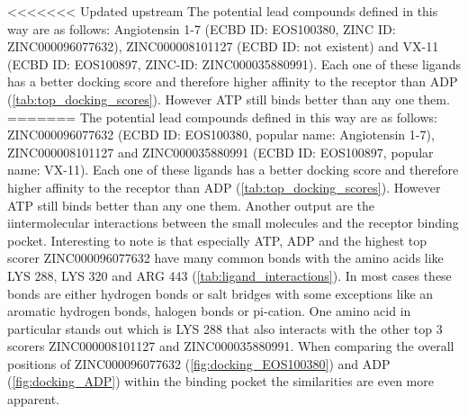 \documentclass[11pt, letterpaper, titlepage]{article}
\begin{document}
<<<<<<< Updated upstream
The potential lead compounds defined in this way are as follows: Angiotensin 1-7 (ECBD ID: EOS100380, ZINC ID: ZINC000096077632), ZINC000008101127 (ECBD ID: not existent) and VX-11 (ECBD ID: EOS100897, ZINC-ID: ZINC000035880991). Each one of these ligands has a better docking score and therefore higher affinity to the receptor than ADP (\autoref{tab:top_docking_scores}). However ATP still binds better than any one them.
=======
The potential lead compounds defined in this way are as follows: ZINC000096077632 (ECBD ID: EOS100380, popular name: Angiotensin 1-7), ZINC000008101127 and ZINC000035880991 (ECBD ID: EOS100897, popular name: VX-11). Each one of these ligands has a better docking score and therefore higher affinity to the receptor than ADP (\autoref{tab:top_docking_scores}). However ATP still binds better than any one them.
Another output are the iintermolecular interactions between the small molecules and the receptor binding pocket. Interesting to note is that especially ATP, ADP and the highest top scorer ZINC000096077632 have many common 
bonds with the amino acids like LYS 288, LYS 320 and ARG 443 (\autoref{tab:ligand_interactions}). In most cases these bonds are either hydrogen bonds or salt bridges with some exceptions like an aromatic hydrogen bonds, halogen bonds or pi-cation. One amino acid in particular stands out which is LYS 288 that also interacts with the other top 3 scorers ZINC000008101127 and ZINC000035880991. 
When comparing the overall positions of ZINC000096077632 (\autoref{fig:docking_EOS100380}) and ADP (\autoref{fig:docking_ADP}) within the binding pocket the similarities are even more apparent. 
\end{document}
